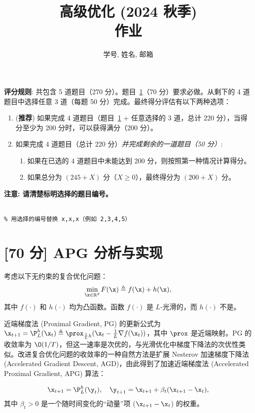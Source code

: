 
\title{\textbf{高级优化 (2024 秋季)\\
作业}}
\author{学号, 姓名, 邮箱}
\maketitle

\begin{tcolorbox}
\textbf{评分规则}: 共包含 5 道题目（270 分）。题目~\ref{sec:APG}（70 分）要求必做。从剩下的 4 道题目中选择任意 3 道（每题 50 分）完成。最终得分评估有以下两种选项：
\begin{enumerate}
  \item (\textbf{推荐}) 如果完成 4 道题目（题目~\ref{sec:APG} + 任意选择的 3 道，总计 220 分），当得分至少为 200 分时，可以获得满分（200 分）。
  \item 如果完成 4 道题目（总计 220 分）\emph{并完成剩余的一道题目（50 分）}:
    \begin{enumerate}
      \item 如果在已选的 4 道题目中未能达到 200 分，则按照第一种情况计算得分。
      \item 如果总分为 $(245+X)$ 分（$X \ge 0$），最终得分为 $(200+X)$ 分。
    \end{enumerate}
\end{enumerate}

\begin{center}
  \textbf{注意: 请清楚标明选择的题目编号。} 

  {\color{red}}  \\  
  \texttt{\% 用选择的编号替换 x,x,x（例如 2,3,4,5）}
\end{center}
\end{tcolorbox}



\newpage
\section{[70 分] APG 分析与实现}
\label{sec:APG}
考虑以下无约束的复合优化问题：
\begin{align*}
  \min_{\x \in \mathbb{R}^d} F(\x) \triangleq f(\x) + h(\x),
\end{align*}
其中 $f(\cdot)$ 和 $h(\cdot)$ 均为凸函数。函数 $f(\cdot)$ 是 $L$-光滑的，而 $h(\cdot)$ 不是。

近端梯度法 (Proximal Gradient, PG) 的更新公式为 $\x_{t+1} = \P^h_L(\x_t) \triangleq \prox_{\frac{1}{L} h} (\x_t - \frac{1}{L} \nabla f(\x_t))$，其中 $\prox$ 是近端映射。PG 的收敛率为 $\O(1/T)$，但这一速率是次优的，与光滑优化中梯度下降法的次优性类似。改进复合优化问题的收敛率的一种自然方法是扩展 Nesterov 加速梯度下降法 (Accelerated Gradient Descent, AGD)，由此得到了加速近端梯度法 (Accelerated Proximal Gradient, APG) 算法：
\begin{tcolorbox}[top=-1pt]
  \begin{align*}
    \x_{t+1} = \P^h_L(\y_t),\quad \y_{t+1} = \x_{t+1} + \beta_t(\x_{t+1} - \x_t),
  \end{align*}
  其中 $\beta_t > 0$ 是一个随时间变化的“动量”项 ($\x_{t+1} - \x_t$) 的权重。
\end{tcolorbox}

